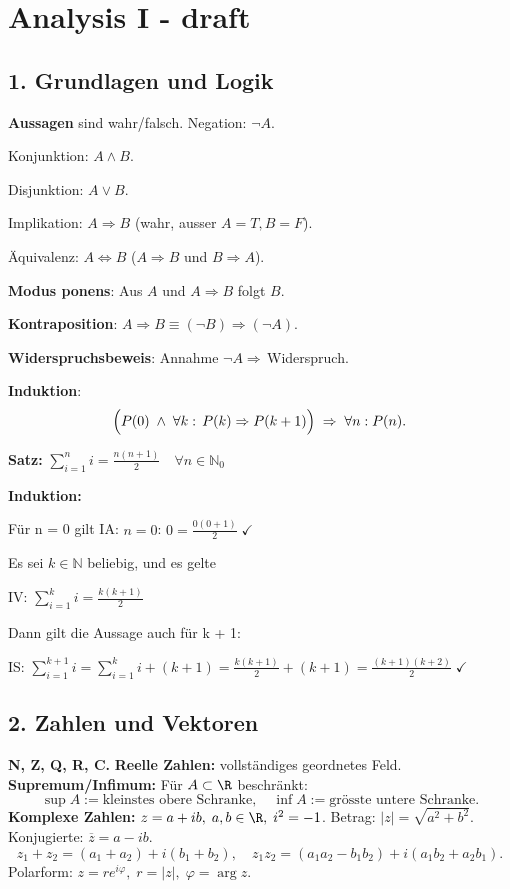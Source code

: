 \section{Analysis I - draft}

\subsection{1. Grundlagen und Logik}
\textbf{Aussagen} sind wahr/falsch.  
Negation: $\lnot A$.  

Konjunktion: $A\wedge B$.  

Disjunktion: $A\vee B$.  

Implikation: $A\Rightarrow B$ (wahr, ausser $A=T,B=F$).  

Äquivalenz: $A\Leftrightarrow B$ ($A\Rightarrow B$ und $B\Rightarrow A$). 

\textbf{Modus ponens}: Aus $A$ und $A\Rightarrow B$ folgt $B$.  

\textbf{Kontraposition}: $A\Rightarrow B\equiv(\lnot B)\Rightarrow(\lnot A)$.  

\textbf{Widerspruchsbeweis}: Annahme $\lnot A\Rightarrow\,$Widerspruch.  

\textbf{Induktion}:  
\[
\Bigl(P(0)\;\wedge\;\forall k:\,P(k)\Rightarrow P(k+1)\Bigr)\;\Rightarrow\;\forall n:P(n).
\]

\textbf{Satz:} \(\displaystyle \sum_{i=1}^n i = \frac{n(n+1)}{2} \quad \forall n \in \mathbb{N}_0\)

\textbf{Induktion:}

Für n = 0 gilt
IA: \(n = 0\): \(0 = \frac{0(0+1)}{2}\;\checkmark\)

Es sei $k \in \mathbb{N}$ beliebig, und es gelte

IV: \(\sum_{i=1}^k i = \frac{k(k+1)}{2}\)

Dann gilt die Aussage auch für k + 1:

IS: \(\sum_{i=1}^{k+1} i = \sum_{i=1}^k i + (k+1)
= \frac{k(k+1)}{2} + (k+1)
= \frac{(k+1)(k+2)}{2}\;\checkmark\)

\subsection{2. Zahlen und Vektoren}
\textbf{N, Z, Q, R, C.}  
\textbf{Reelle Zahlen:} vollständiges geordnetes Feld.  
\textbf{Supremum/Infimum:} Für $A\subset\R$ beschränkt:  
\[
\sup A:=\text{kleinstes obere Schranke},\quad
\inf A:=\text{grösste untere Schranke}.
\]
\textbf{Komplexe Zahlen:} $z=a+ib,\;a,b\in\R,\;i^2=-1$.  
Betrag: $|z|=\sqrt{a^2+b^2}$.  
Konjugierte: $\overline z=a-ib$.  
\[
z_1+z_2=(a_1+a_2)+i(b_1+b_2),\quad
z_1z_2=(a_1a_2-b_1b_2)+i(a_1b_2+a_2b_1).
\]
Polarform: $z=r e^{i\varphi},\;r=|z|,\;\varphi=\arg z$.

